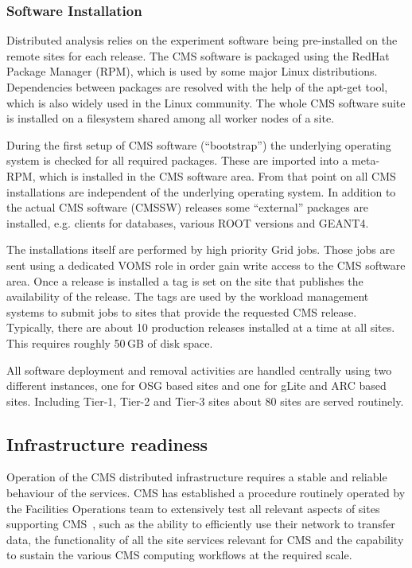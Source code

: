 \subsubsection{ Software Installation }
\label{sec:4_1_3}
Distributed analysis relies on the experiment software being
pre-installed on the remote sites for each release. The CMS software
is packaged using the RedHat Package Manager (RPM), which is used by
some major Linux distributions. Dependencies between packages are
resolved with the help of the apt-get tool, which is also widely used in
the Linux community. The whole CMS software suite is installed
on a filesystem shared among all worker nodes of a site.

During the
first setup of CMS software (``bootstrap'') the underlying operating system is
checked for all required packages. These are imported into a meta-RPM,
which is installed in the CMS software area. From that point on all
CMS installations are independent of the underlying operating
system. In addition to the actual CMS software (CMSSW) releases some ``external'' 
packages are installed, e.g. clients for databases, various ROOT
versions and GEANT4.

The installations itself are performed by high priority Grid
jobs. Those jobs are sent using a dedicated VOMS role %
in order gain write access to the CMS software area. Once a release is
installed a tag is set on the 
site that publishes the availability of
the release. The tags are used by the workload management systems to
submit jobs to sites that provide the requested CMS release.
Typically, there are about 10 production releases installed at a time at all
sites. This requires roughly 50\,GB of disk space.

All software deployment and  removal activities are handled centrally
using two different instances, one for OSG based sites and one for
gLite and ARC based sites. Including Tier-1, Tier-2 and Tier-3
sites about 80 sites are served routinely.

\subsection{Infrastructure readiness}
\label{sec:4_2}
Operation of the CMS distributed infrastructure requires a stable and 
reliable behaviour of the services.
CMS has established a procedure routinely operated by the Facilities 
Operations team to extensively test all relevant aspects of sites 
supporting CMS~\cite{RefSite}, such as the ability to efficiently use their 
network to transfer data, the functionality of all the site services relevant 
for CMS and the capability to sustain the various CMS computing workflows at 
the required scale.


